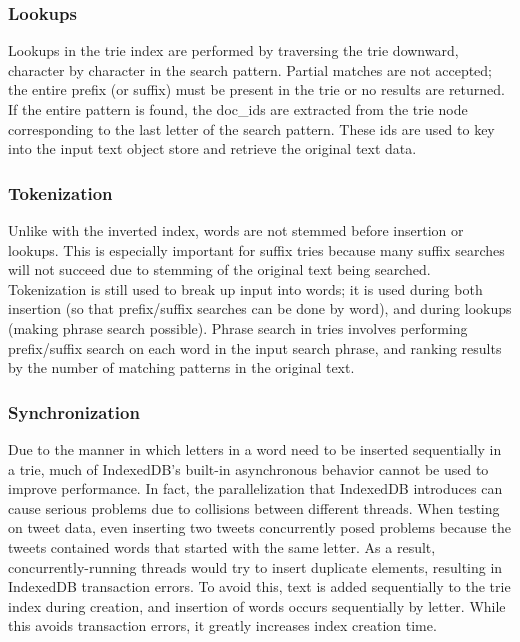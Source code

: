 \documentclass{vldb}
\begin{document}
\subsubsection{Lookups}
Lookups in the trie index are performed by traversing the trie downward, character by character in the search pattern. Partial matches are not accepted; the entire prefix (or suffix) must be present in the trie or no results are returned. If the entire pattern is found, the doc\_ids are extracted from the trie node corresponding to the last letter of the search pattern. These ids are used to key into the input text object store and retrieve the original text data.

\subsubsection{Tokenization}
Unlike with the inverted index, words are not stemmed before insertion or lookups. This is especially important for suffix tries because many suffix searches will not succeed due to stemming of the original text being searched. Tokenization is still used to break up input into words; it is used during both insertion (so that prefix/suffix searches can be done by word), and during lookups (making phrase search possible). Phrase search in tries involves performing prefix/suffix search on each word in the input search phrase, and ranking results by the number of matching patterns in the original text. 

\subsubsection{Synchronization}
Due to the manner in which letters in a word need to be inserted sequentially in a trie, much of IndexedDB's built-in asynchronous behavior cannot be used to improve performance. In fact, the parallelization that IndexedDB introduces can cause serious problems due to collisions between different threads. When testing on tweet data, even inserting two tweets concurrently posed problems because the tweets contained words that started with the same letter. As a result, concurrently-running threads would try to insert duplicate elements, resulting in IndexedDB transaction errors. To avoid this, text is added sequentially to the trie index during creation, and insertion of words occurs sequentially by letter. While this avoids transaction errors, it greatly increases index creation time.
\end{document}
